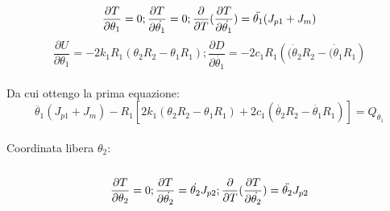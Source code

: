 \documentclass{article}
\begin{document}
\begin{equation*}
{ \partial T \over \partial \theta_{1}} = 0 ; { \partial T \over \partial   \dot{\theta_{1}} } = 0;  \frac{\partial}{\partial T}(\frac{\partial T}{\partial \dot{\theta_{1}}})  = \ddot{\theta_{1}}(J_{p1} + J_{m})
\end{equation*}
\begin{equation*}
\frac{\partial U}{\partial \theta_{1}} = -2k_{1}R_{1}(\theta_{2}R_{2} - \theta_{1}R_{1});
\frac{\partial D}{\partial \dot{\theta_{1}}} = -2c_{1}R_{1}(\dot{(\theta_{2}}R_{2} - \dot{(\theta_{1}}R_{1})
\end{equation*}
\\
Da cui ottengo la prima equazione: 
\\
\begin{equation*}
 \ddot{\theta_{1}}(J_{p1}+J_{m}) - R_{1}[2k_{1}(\theta_{2}R_{2}-\theta_{1}R_{1})+ 2c_{1}(\dot{\theta_{2}}R_{2}-\dot{\theta_{1}}R_{1})] = Q_{\theta_1}
\end{equation*}
\\
Coordinata libera $\theta_{2}$:
\\
\\
\begin{equation*}
{ \partial T \over \partial \theta_{2}} = 0 ; { \partial T \over \partial   \dot{\theta_{2}} } = \dot{\theta_{2}}J_{p2};  \frac{\partial}{\partial T}(\frac{\partial T}{\partial \dot{\theta_{2}}})  = \ddot{\theta_{2}}J_{p2}
\end{equation*}
\end{document}
